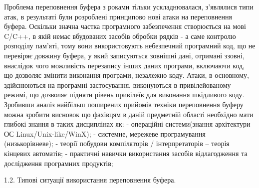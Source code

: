 \documentclass[oneside,final,14pt]{extreport}
\begin{document}
Проблема переповнення буфера з роками тільки ускладнювалася, з'являлися типи атак, в результаті були розроблені принципово нові атаки на переповнення буфера.
Оскільки значна частка програмного забезпечення створюється на мові C/C++, в якій немає вбудованих засобів обробки рядків - а саме контролю розподілу пам’яті, тому вони використовують небезпечний програмний код, що не перевіряє довжину буфера, у який записуються зовнішні дані, отримані ззовні, внаслідок чого можливість перезапису інших даних програми, включаючи код, що дозволяє змінити виконання програми, незалежно коду. Атаки, в основному, здійснюються на програмні застосування, виконуються в привілейованому режимі, що дозволяє підняти рівень привілеїв для виконання шкідливого коду.
Зробивши аналіз найбільш поширених прийомів техніки переповнення буферу можна зробити висновок що фахівцям в даній предметній області необхідно мати глибокі знання в таких дисциплінах як:
- операційні системи(знання архітектури ОС Linux/Unix-like/WinX);
- системне, мережеве програмування (низькорівневе);
- теорії побудови компіляторів / інтерпретаторів – теорія кінцевих автоматів;
- практичні навички використання засобів відлагодження та дослідження програмних продуктів;

1.2.    Типові ситуації використання переповнення буфера.
\end{document}
